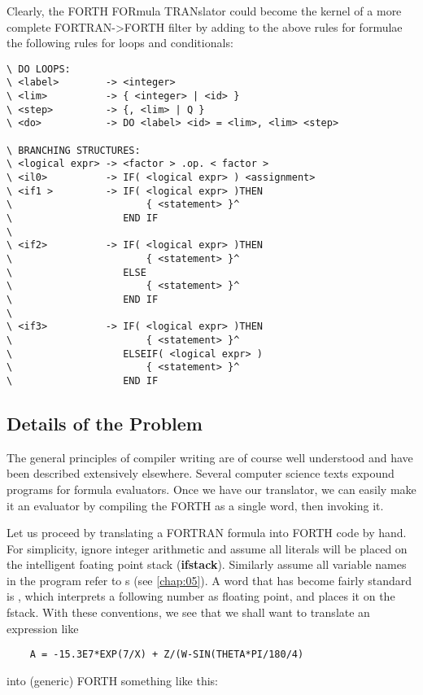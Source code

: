 Clearly, the FORTH FORmula TRANslator could become the kernel of a more complete FORTRAN->FORTH filter by adding to the above rules for formulae the following rules for loops and conditionals:

\begin{verbatim}
\ DO LOOPS:
\ <label>        -> <integer>
\ <lim>          -> { <integer> | <id> }
\ <step>         -> {, <lim> | Q }
\ <do>           -> DO <label> <id> = <lim>, <lim> <step>

\ BRANCHING STRUCTURES:
\ <logical expr> -> <factor > .op. < factor >
\ <il0>          -> IF( <logical expr> ) <assignment>
\ <if1 >         -> IF( <logical expr> )THEN
\                       { <statement> }^
\                   END IF
\
\ <if2>          -> IF( <logical expr> )THEN
\                       { <statement> }^
\                   ELSE
\                       { <statement> }^
\                   END IF
\
\ <if3>          -> IF( <logical expr> )THEN
\                       { <statement> }^
\                   ELSEIF( <logical expr> )
\                       { <statement> }^
\                   END IF
\end{verbatim}

\subsection{Details of the Problem}
The general principles of compiler writing are of course well understood and have been described extensively elsewhere. Several computer science texts expound programs for formula evaluators. Once we have our translator, we can easily make it an evaluator by compiling the FORTH as a single word, then invoking it.

Let us proceed by translating a FORTRAN formula into FORTH code by hand. For simplicity, ignore integer arithmetic and assume all literals will be placed on the intelligent foating point stack (\textbf{ifstack}). Similarly assume all variable names in the program refer to \bc{SCALAR}s (see \ref{chap:05}). A word that has become fairly standard is \bc{\%}, which interprets a following number as floating point, and places it on the fstack. With these conventions, we see that we shall want to translate an expression like

\begin{lstlisting}
    A = -15.3E7*EXP(7/X) + Z/(W-SIN(THETA*PI/180/4)
\end{lstlisting}

into (generic) FORTH something like this:

